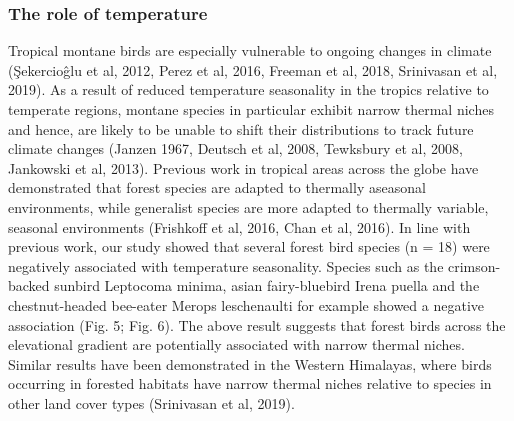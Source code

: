 \subsubsection*{The role of temperature}

Tropical montane birds are especially vulnerable to ongoing changes in climate (Şekercioĝlu et al, 2012, Perez et al, 2016, Freeman et al, 2018, Srinivasan et al, 2019).
As a result of reduced temperature seasonality in the tropics relative to temperate regions, montane species in particular exhibit narrow thermal niches and hence, are likely to be unable to shift their distributions to track future climate changes (Janzen 1967, Deutsch et al, 2008, Tewksbury et al, 2008, Jankowski et al, 2013).
Previous work in tropical areas across the globe have demonstrated that forest species are adapted to thermally aseasonal environments, while generalist species are more adapted to thermally variable, seasonal environments (Frishkoff et al, 2016, Chan et al, 2016).
In line with previous work, our study showed that several forest bird species (n = 18) were negatively associated with temperature seasonality.
Species such as the crimson-backed sunbird Leptocoma minima, asian fairy-bluebird Irena puella and the chestnut-headed bee-eater Merops leschenaulti for example showed a negative association (Fig. 5; Fig. 6).
The above result suggests that forest birds across the elevational gradient are potentially associated with narrow thermal niches.
Similar results have been demonstrated in the Western Himalayas, where birds occurring in forested habitats have narrow thermal niches relative to species in other land cover types (Srinivasan et al, 2019).

